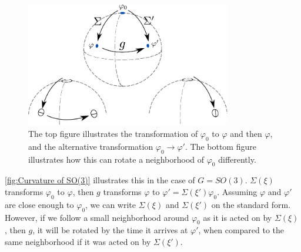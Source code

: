 \begin{figure}[h]
    \centering
    \includegraphics[width=0.8\textwidth]{figurer/SU(3).pdf}
    \caption{The top figure illustrates the transformation of $\varphi_0$ to $\varphi$ and then $\varphi$, and the alternative transformation $\varphi_0 \rightarrow \varphi'$. The bottom figure illustrates how this can rotate a neighborhood of $\varphi_0$ differently.}
    \label{fig:Curvature of SO(3)}
\end{figure}
\autoref{fig:Curvature of SO(3)} illustrates this in the case of $G = SO(3)$.
$\Sigma(\xi)$ transforms $\varphi_0$ to $\varphi$, then $g$ transforms $\varphi$ to $\varphi' = \Sigma(\xi') \varphi_0$.
Assuming $\varphi$ and $\varphi'$ are close enough to $\varphi_0$, we can write $\Sigma(\xi)$ and $\Sigma(\xi')$ on the standard form.
However, if we follow a small neighborhood around $\varphi_0$ as it is acted on by $\Sigma(\xi)$, then $g$, it will be rotated by the time it arrives at $\varphi'$, when compared to the same neighborhood if it was acted on by $\Sigma(\xi')$.

